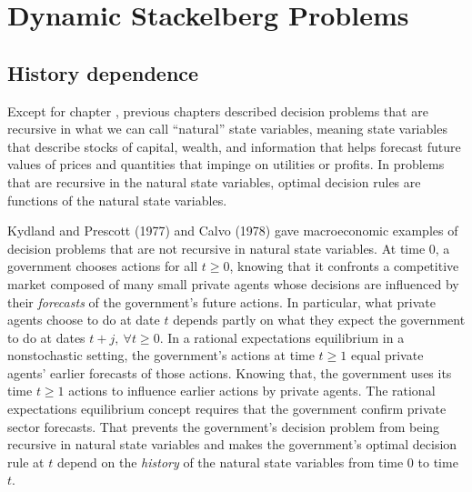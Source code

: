 

%






\def\toone{{t+1}}
\def\ttwo{{t+2}}
\def\tthree{{t+3}}
\def\Tone{{T+1}}
\def\TTT{{T-1}}
\def\rtr{{\rm tr}}

\chapter{Dynamic Stackelberg Problems\label{stackel}}

\section{History dependence}

  Except for chapter , previous chapters described decision problems that are recursive in
what we can call ``natural'' state variables, meaning state variables that
describe stocks of capital, wealth, and information that helps forecast
future values of prices and quantities that impinge on  utilities
or profits.  In problems that are recursive in the natural state variables,
optimal decision rules are functions of the natural state variables.

Kydland and Prescott (1977)  and Calvo (1978) gave
macroeconomic examples of decision problems
that %
are not  recursive in natural state variables.
At time $0$, a government
chooses  actions for all $t \geq 0$, knowing that it  confronts  a competitive market composed of many small private
agents
whose decisions are influenced by their
{\it forecasts\/} of the government's future actions. In particular, what private agents choose to do at date $t$ depends
 partly on what they expect the government  to do at dates $t+j, \ \forall t \geq 0$.   In a rational expectations equilibrium in a nonstochastic setting,
 the government's actions at time $t \geq 1$ equal private agents' earlier forecasts of
those actions.
Knowing that, the government uses its time $t \geq 1$ actions
to influence earlier actions by private agents.  The rational expectations equilibrium concept requires that the government  confirm
private sector forecasts. That
prevents the government's decision problem from being
recursive in  natural state variables and makes  the government's optimal
decision rule at $t$ depend on the {\it history\/} of the natural
state variables from time $0$ to time $t$.

